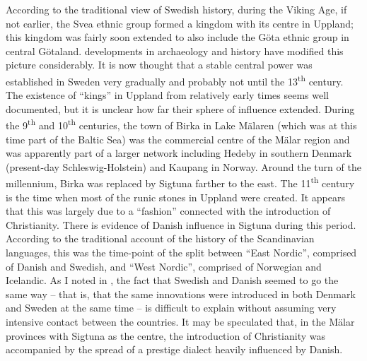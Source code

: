\begin{styleBodyTextFirst}
According to the traditional view of Swedish history, during the Viking Age, if not earlier, the Svea ethnic group formed a kingdom with its centre in Uppland; this kingdom was fairly soon extended to also include the Göta ethnic group in central Götaland. developments in archaeology and history have modified this picture considerably. It is now thought that a stable central power was established in Sweden very gradually and probably not until the 13\textsuperscript{th} century. The existence of “kings” in Uppland from relatively early times seems well documented, but it is unclear how far their sphere of influence extended. During the 9\textsuperscript{th} and 10\textsuperscript{th} centuries, the town of Birka in Lake Mälaren (which was at this time part of the Baltic Sea) was the commercial centre of the Mälar region and was apparently part of a larger network including Hedeby in southern Denmark (present-day Schleswig-Holstein) and Kaupang in Norway. Around the turn of the millennium, Birka was replaced by Sigtuna farther to the east. The 11\textsuperscript{th} century is the time when most of the runic stones in Uppland were created. It appears that this was largely due to a “fashion” connected with the introduction of Christianity. There is evidence of Danish influence in Sigtuna during this period. According to the traditional account of the history of the Scandinavian languages, this was the time-point of the split between “East Nordic”, comprised of Danish and Swedish, and “West Nordic”, comprised of Norwegian and Icelandic. As I noted in \citet{Dahl2001}, the fact that Swedish and Danish seemed to go the same way – that is, that the same innovations were introduced in both Denmark and Sweden at the same time – is difficult to explain without assuming very intensive contact between the countries. It may be speculated that, in the Mälar provinces with Sigtuna as the centre, the introduction of Christianity was accompanied by the spread of a prestige dialect heavily influenced by Danish. 

\end{styleBodyTextFirst}

